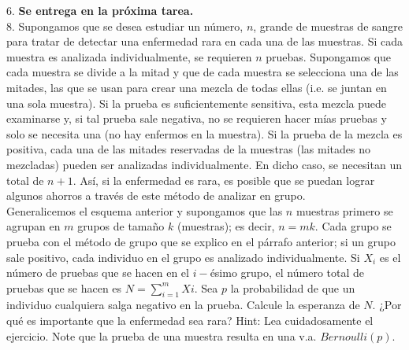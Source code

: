 \documentclass[11pt,letterpaper]{article}
\begin{document}
6. \textbf{Se entrega en la próxima tarea.} \\


8. Supongamos que se desea estudiar un número, $n$, grande de muestras de sangre para tratar de detectar una enfermedad rara en cada una de las muestras. Si cada muestra es analizada individualmente, se requieren $n$ pruebas. Supongamos que cada muestra se divide a la mitad y que de cada muestra se selecciona una de las mitades, las que se usan para crear una mezcla de todas ellas (i.e. se juntan en una sola muestra). Si la prueba es suficientemente sensitiva, esta mezcla puede examinarse y, si tal prueba sale negativa, no se requieren hacer mías pruebas y solo se necesita una (no hay enfermos en la muestra). Si la prueba de la mezcla es positiva, cada una de las mitades reservadas de la muestras (las mitades no mezcladas) pueden ser analizadas individualmente. En dicho caso, se necesitan un total de $n+ 1$. Así, si la enfermedad es rara, es posible que se puedan lograr algunos ahorros a través de este método
de analizar en grupo.\\
Generalicemos el esquema anterior y supongamos que las $n$ muestras primero se agrupan en $m$ grupos de tamaño $k$ (muestras); es decir, $n = mk$. Cada grupo se prueba con el método de grupo que se explico en el párrafo anterior; si un grupo sale positivo, cada individuo en el grupo es analizado individualmente. Si $X_i$ es el número de pruebas que se hacen en el $i-$ésimo grupo, el número total de pruebas que se hacen es $N =\sum_{i=1}^m Xi$. Sea $p$ la probabilidad de
que un individuo cualquiera salga negativo en la prueba. Calcule la esperanza de $N$. ¿Por qué es importante que la enfermedad sea rara? Hint: Lea cuidadosamente el ejercicio. Note que la prueba de una muestra resulta en una v.a. $Bernoulli(p)$.
\end{document}
